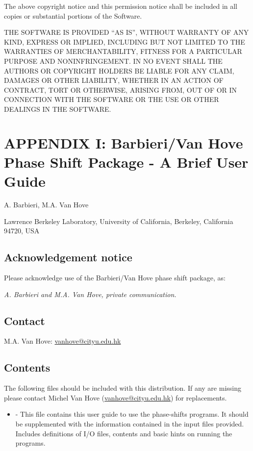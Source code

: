 \documentclass[letterpaper,10pt,english]{sphinxmanual}
\begin{document}
The above copyright notice and this permission notice shall be included in
all copies or substantial portions of the Software.

THE SOFTWARE IS PROVIDED ``AS IS'', WITHOUT WARRANTY OF ANY KIND, EXPRESS OR
IMPLIED, INCLUDING BUT NOT LIMITED TO THE WARRANTIES OF MERCHANTABILITY,
FITNESS FOR A PARTICULAR PURPOSE AND NONINFRINGEMENT. IN NO EVENT SHALL THE
AUTHORS OR COPYRIGHT HOLDERS BE LIABLE FOR ANY CLAIM, DAMAGES OR OTHER
LIABILITY, WHETHER IN AN ACTION OF CONTRACT, TORT OR OTHERWISE, ARISING FROM,
OUT OF OR IN CONNECTION WITH THE SOFTWARE OR THE USE OR OTHER DEALINGS IN
THE SOFTWARE.


\chapter{APPENDIX I: Barbieri/Van Hove Phase Shift Package - A Brief User Guide}
\label{phshift2007:appendix-i-barbieri-van-hove-phase-shift-package-a-brief-user-guide}\label{phshift2007::doc}
A. Barbieri, M.A. Van Hove

Lawrence Berkeley Laboratory,
University of California,
Berkeley,
California 94720, USA


\section{Acknowledgement notice}
\label{phshift2007:acknowledgement-notice}
Please acknowledge use of the Barbieri/Van Hove
phase shift package, as:

\emph{A. Barbieri and M.A. Van Hove, private communication.}


\section{Contact}
\label{phshift2007:contact}
M.A. Van Hove:  \href{mailto:vanhove@cityu.edu.hk}{vanhove@cityu.edu.hk}


\section{Contents}
\label{phshift2007:contents}
The following files should be included with this distribution. If any
are missing please contact Michel Van Hove (\href{mailto:vanhove@cityu.edu.hk}{vanhove@cityu.edu.hk})
for replacements.
\begin{itemize}
\item {} 
 - This file contains this user guide
to use the phase-shifts programs. It should be
supplemented with the information contained in
the input files provided. Includes definitions of I/O files,
contents and basic hints on running the programs.

\end{itemize}
\end{document}

